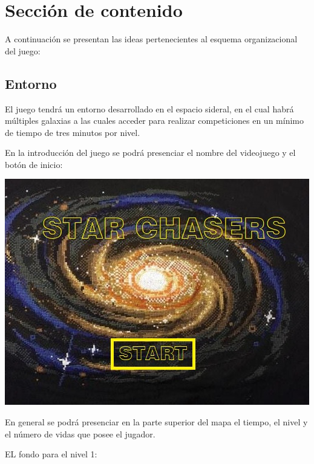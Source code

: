 \documentclass{article}
\begin{document}
\section{Sección de contenido} \label{contenido}
A continuación se presentan las ideas pertenecientes al esquema organizacional del juego:

\subsection{Entorno}
El juego tendrá un entorno desarrollado en el espacio sideral, en el cual habrá múltiples galaxias a las cuales acceder para realizar competiciones en un mínimo de tiempo de tres minutos por nivel. 

En la introducción del juego se podrá presenciar el nombre del videojuego y el botón de inicio:


\includegraphics[scale=0.59]{Ideación/Images/Start.jpeg}


En general se podrá presenciar en la parte superior del mapa el tiempo, el nivel y el número de vidas que posee el jugador. 

EL fondo para el nivel 1: 
\end{document}
